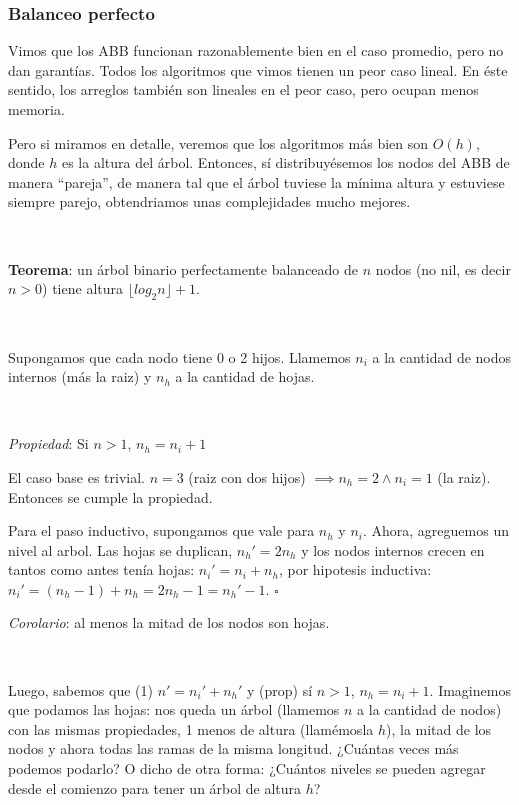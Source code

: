 \subsubsection{Balanceo perfecto}

Vimos que los ABB funcionan razonablemente bien en el caso promedio, pero no dan garant\'ias. Todos los algoritmos que vimos tienen un peor caso lineal. En \'este sentido, los arreglos tambi\'en son lineales en el peor caso, pero ocupan menos memoria.

Pero si miramos en detalle, veremos que los algoritmos m\'as bien son $O(h)$, donde $h$ es la altura del \'arbol. Entonces, s\'i distribuy\'esemos los nodos del ABB de manera ``pareja'', de manera tal que el \'arbol tuviese la m\'inima altura y estuviese siempre parejo, obtendriamos unas complejidades mucho mejores.

~

\textbf{Teorema}: un \'arbol binario perfectamente balanceado de $n$ nodos (no nil, es decir $n>0$) tiene altura $\lfloor log_2 n \rfloor + 1$.

~

Supongamos que cada nodo tiene 0 o 2 hijos. Llamemos $n_i$ a la cantidad de nodos internos (m\'as la raiz) y $n_h$ a la cantidad de hojas.

~

\textit{Propiedad}: Si $n > 1$, $n_h = n_i + 1$

El caso base es trivial. $n = 3$ (raiz con dos hijos) $\implies n_h = 2 \land n_i = 1$ (la raiz). Entonces se cumple la propiedad.

Para el paso inductivo, supongamos que vale para $n_h$ y $n_i$. Ahora, agreguemos un nivel al arbol. Las hojas se duplican, $n_h' = 2n_h$ y los nodos internos crecen en tantos como antes ten\'ia hojas:
$n_i' = n_i + n_h$, por hipotesis inductiva: $n_i' = (n_h - 1) + n_h = 2n_h - 1 = n_h' - 1$. $\square$

\textit{Corolario}: al menos la mitad de los nodos son hojas.

~

Luego, sabemos que (1) $n' = n_i' + n_h'$ y (prop) s\'i $n > 1$, $n_h = n_i + 1$. Imaginemos que podamos las hojas: nos queda un \'arbol (llamemos $n$ a la cantidad de nodos) con las mismas propiedades, 1 menos de altura (llam\'emosla $h$), la mitad de los nodos y ahora todas las ramas de la misma longitud. ¿Cu\'antas veces m\'as podemos podarlo? O dicho de otra forma: ¿Cu\'antos niveles se pueden agregar desde el comienzo para tener un \'arbol de altura $h$?

